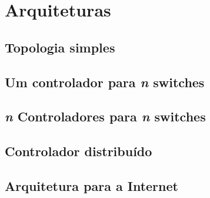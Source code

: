 \section{Arquiteturas}


\subsection{Topologia simples}

\subsection{Um controlador para \emph{n} switches}

\subsection{\emph{n} Controladores para \emph{n} switches}

\subsection{Controlador distribuído}

\subsection{Arquitetura para a Internet}
